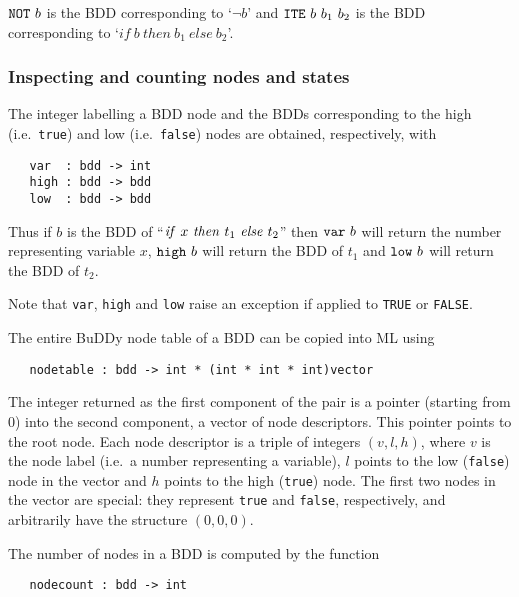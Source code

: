 \documentclass[12pt]{book}
\renewcommand{\t}[1]{\mbox{\tt #1}}
\newcommand{\Buddy}{BuDDy{}}
\begin{document}
$\t{NOT}~b$ is the BDD corresponding to  `$\neg b$' and $\t{ITE}~b~b_1~b_2$ is the BDD corresponding
to `$if~b~then~b_1~else~b_2$'.




\subsubsection{Inspecting and counting nodes and states}

The integer labelling a BDD node and the BDDs corresponding to the high
(i.e.~{\t{true}}) and low (i.e.~{\t{false}}) nodes are obtained,
respectively, with

\begin{verbatim}
   var  : bdd -> int
   high : bdd -> bdd
   low  : bdd -> bdd
\end{verbatim}

Thus if $b$ is the BDD of ``${\it{if}}~x~{\it{then}}~t_1~{\it{else}}~t_2$''
then $\t{var}~b$ will return the number representing variable $x$,
$\t{high}~b$ will return the BDD of $t_1$ and $\t{low}~b$ will return
the BDD of $t_2$.

Note that \t{var}, \t{high} and \t{low} raise an exception if applied
to \t{TRUE} or \t{FALSE}.

The entire \Buddy{} node table of a BDD can be copied into ML using

\begin{verbatim}
   nodetable : bdd -> int * (int * int * int)vector
\end{verbatim}

The integer returned as the first component of the pair is a pointer
(starting from 0) into the second component, a vector of node
descriptors. This pointer points to the root node. Each node
descriptor is a triple of integers $(v,l,h)$, where $v$ is the node
label (i.e.~a number representing a variable), $l$ points to the low
({\t{false}}) node in the vector and $h$ points to the high
({\t{true}}) node. The first two nodes in the vector are special:
they represent {\t{true}} and {\t{false}}, respectively, and arbitrarily have
the structure $(0,0,0)$.

The number of nodes in a BDD is computed by the function

\begin{verbatim}
   nodecount : bdd -> int
\end{verbatim}
\end{document}
